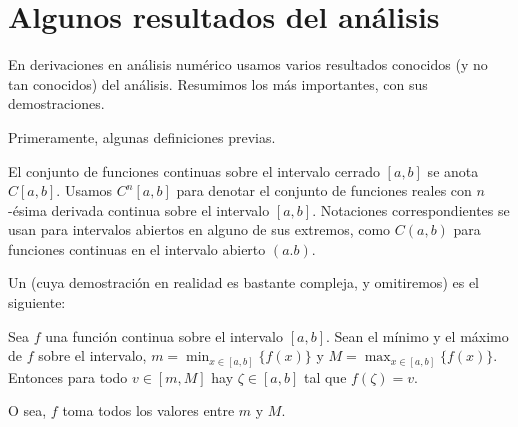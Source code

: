 %

\chapter{Algunos resultados del análisis}
\label{apx:analysis}

  En derivaciones en análisis numérico
  usamos varios resultados conocidos
  (y no tan conocidos)
  del análisis.
  Resumimos los más importantes,
  con sus demostraciones.

  Primeramente,
  algunas definiciones previas.
  \begin{definition}
    El conjunto de funciones continuas sobre el intervalo cerrado \([a, b]\)
    se anota \(C[a, b]\).
    Usamos \(C^n[a, b]\) para denotar el conjunto de funciones reales
    con \(n\)\nobreakdash-ésima derivada continua
    sobre el intervalo \([a, b]\).
    Notaciones correspondientes se usan para intervalos abiertos
    en alguno de sus extremos,
    como \(C(a, b)\) para funciones continuas
    en el intervalo abierto \((a. b)\).
  \end{definition}

  Un 
  (cuya demostración en realidad es bastante compleja,
   y omitiremos)
  es el siguiente:
  \begin{theorem}
    \label{theo:extreme value}
    Sea \(f\) una función continua sobre el intervalo \([a, b]\).
    Sean el mínimo y el máximo de \(f\) sobre el intervalo,
    \(m = \min_{x \in [a, b]} \{ f(x) \}\)
    y \(M = \max_{x \in [a, b]} \{ f(x) \}\).
    Entonces para todo \(v \in [m, M]\)
    hay \(\zeta \in [a, b]\) tal que \(f(\zeta) = v\).
  \end{theorem}
  O sea,
  \(f\) toma todos los valores entre \(m\) y \(M\).

